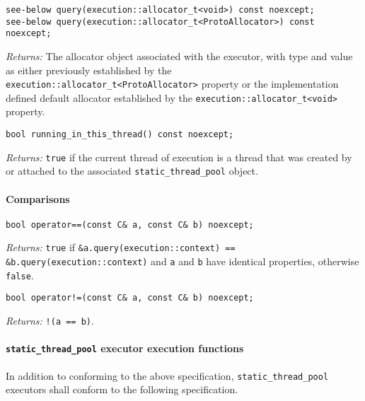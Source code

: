 \documentclass[a4paper,12pt,notitlepage,twoside,openright]{article}
\begin{document}
\begin{verbatim}
see-below query(execution::allocator_t<void>) const noexcept;
see-below query(execution::allocator_t<ProtoAllocator>) const noexcept;
\end{verbatim}

\emph{Returns:} The allocator object associated with the executor, with
type and value as either previously established by the
\texttt{execution::allocator_t<ProtoAllocator>} property or
the implementation defined default allocator established by the
\texttt{execution::allocator_t<void>} property.

\begin{verbatim}
bool running_in_this_thread() const noexcept;
\end{verbatim}

\emph{Returns:} \texttt{true} if the current thread of
execution is a thread that was created by or attached to the associated
\texttt{static_thread_pool} object.

\hypertarget{comparisons-2}{%
\paragraph{Comparisons}\label{comparisons-2}}

\begin{verbatim}
bool operator==(const C& a, const C& b) noexcept;
\end{verbatim}

\emph{Returns:} \texttt{true} if
\texttt{&a.query(execution::context) == &b.query(execution::context)}
and \texttt{a} and \texttt{b} have identical
properties, otherwise \texttt{false}.

\begin{verbatim}
bool operator!=(const C& a, const C& b) noexcept;
\end{verbatim}

\emph{Returns:} \texttt{!(a == b)}.

\hypertarget{static_thread_pool-executor-execution-functions}{%
\paragraph{\texorpdfstring{\texttt{static_thread_pool}
executor execution
functions}{ executor execution functions}}\label{static_thread_pool-executor-execution-functions}}

In addition to conforming to the above specification,
\texttt{static_thread_pool} executors shall conform to the
following specification.
\end{document}
